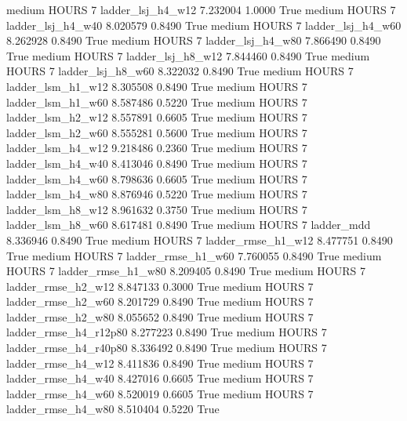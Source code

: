     medium    HOURS                 7      ladder_lsj_h4_w12   7.232004      1.0000    True
    medium    HOURS                 7      ladder_lsj_h4_w40   8.020579      0.8490    True
    medium    HOURS                 7      ladder_lsj_h4_w60   8.262928      0.8490    True
    medium    HOURS                 7      ladder_lsj_h4_w80   7.866490      0.8490    True
    medium    HOURS                 7      ladder_lsj_h8_w12   7.844460      0.8490    True
    medium    HOURS                 7      ladder_lsj_h8_w60   8.322032      0.8490    True
    medium    HOURS                 7      ladder_lsm_h1_w12   8.305508      0.8490    True
    medium    HOURS                 7      ladder_lsm_h1_w60   8.587486      0.5220    True
    medium    HOURS                 7      ladder_lsm_h2_w12   8.557891      0.6605    True
    medium    HOURS                 7      ladder_lsm_h2_w60   8.555281      0.5600    True
    medium    HOURS                 7      ladder_lsm_h4_w12   9.218486      0.2360    True
    medium    HOURS                 7      ladder_lsm_h4_w40   8.413046      0.8490    True
    medium    HOURS                 7      ladder_lsm_h4_w60   8.798636      0.6605    True
    medium    HOURS                 7      ladder_lsm_h4_w80   8.876946      0.5220    True
    medium    HOURS                 7      ladder_lsm_h8_w12   8.961632      0.3750    True
    medium    HOURS                 7      ladder_lsm_h8_w60   8.617481      0.8490    True
    medium    HOURS                 7             ladder_mdd   8.336946      0.8490    True
    medium    HOURS                 7     ladder_rmse_h1_w12   8.477751      0.8490    True
    medium    HOURS                 7     ladder_rmse_h1_w60   7.760055      0.8490    True
    medium    HOURS                 7     ladder_rmse_h1_w80   8.209405      0.8490    True
    medium    HOURS                 7     ladder_rmse_h2_w12   8.847133      0.3000    True
    medium    HOURS                 7     ladder_rmse_h2_w60   8.201729      0.8490    True
    medium    HOURS                 7     ladder_rmse_h2_w80   8.055652      0.8490    True
    medium    HOURS                 7  ladder_rmse_h4_r12p80   8.277223      0.8490    True
    medium    HOURS                 7  ladder_rmse_h4_r40p80   8.336492      0.8490    True
    medium    HOURS                 7     ladder_rmse_h4_w12   8.411836      0.8490    True
    medium    HOURS                 7     ladder_rmse_h4_w40   8.427016      0.6605    True
    medium    HOURS                 7     ladder_rmse_h4_w60   8.520019      0.6605    True
    medium    HOURS                 7     ladder_rmse_h4_w80   8.510404      0.5220    True
